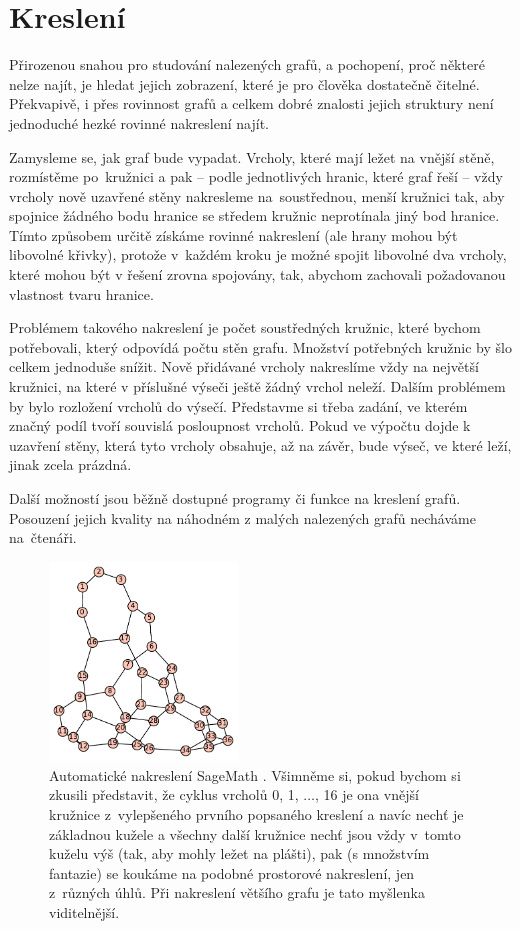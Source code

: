 
\chapter{Kreslení} \label{kresleni}

Přirozenou snahou pro studování nalezených grafů, a pochopení, proč některé nelze najít, je hledat jejich zobrazení, které je pro člověka dostatečně čitelné. Překvapivě, i přes rovinnost grafů a celkem dobré znalosti jejich struktury není jednoduché hezké rovinné nakreslení najít.

Zamysleme se, jak graf bude vypadat. Vrcholy, které mají ležet na vnější stěně, rozmístěme po~kružnici a pak -- podle jednotlivých hranic, které graf řeší -- vždy vrcholy nově uzavřené stěny nakresleme na~soustřednou, menší kružnici tak, aby spojnice žádného bodu hranice se středem kružnic neprotínala jiný bod hranice. Tímto způsobem určitě získáme rovinné nakreslení (ale hrany mohou být libovolné křivky), protože v~každém kroku je možné spojit libovolné dva vrcholy, které mohou být v řešení zrovna spojovány, tak, abychom zachovali požadovanou vlastnost tvaru hranice.

Problémem takového nakreslení je počet soustředných kružnic, které bychom potřebovali, který odpovídá počtu stěn grafu. Množství potřebných kružnic by šlo celkem jednoduše snížit. Nově přidávané vrcholy nakreslíme vždy na největší kružnici, na které v příslušné výseči ještě žádný vrchol neleží. Dalším problémem by bylo rozložení vrcholů do výsečí. Představme si třeba zadání, ve kterém značný podíl tvoří souvislá posloupnost  vrcholů. Pokud ve výpočtu dojde k uzavření stěny, která tyto vrcholy obsahuje, až na závěr, bude výseč, ve které leží, jinak zcela prázdná.

Další možností jsou běžně dostupné programy či funkce na kreslení grafů. Posouzení jejich kvality na náhodném z malých nalezených grafů necháváme na~čtenáři.


\begin{figure}[h]\centering
\includegraphics[width = 50mm]{../img/sageplot}
\caption{Automatické nakreslení SageMath \cite{sagemath}. Všimněme si, pokud bychom si zkusili představit, že cyklus vrcholů 0, 1, $\dots$, 16 je ona vnější kružnice z~vylepšeného prvního popsaného kreslení a navíc nechť je základnou kužele a všechny další kružnice nechť jsou vždy v~tomto kuželu výš (tak, aby mohly ležet na plášti), pak (s množstvím fantazie) se koukáme na podobné prostorové nakreslení, jen z~různých úhlů. Při nakreslení většího grafu je tato myšlenka viditelnější.}
\label{obr:sageplot}
\end{figure}


